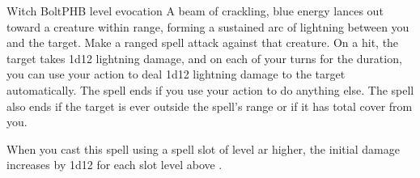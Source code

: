 \begin{spell}{Witch Bolt}{PHB}{ level evocation}
{
}
A beam of crackling, blue energy lances out toward
a creature within range, forming a sustained arc of
lightning between you and the target. Make a ranged
spell attack against that creature. On a hit, the target
takes 1d12 lightning damage, and on each of your turns
for the duration, you can use your action to deal 1d12
lightning damage to the target automatically. The spell
ends if you use your action to do anything else. The spell
also ends if the target is ever outside the spell's range or
if it has total cover from you.

 When you cast this spell using
a spell slot of  level ar higher, the initial damage
increases by 1d12 for each slot level above .
\end{spell}